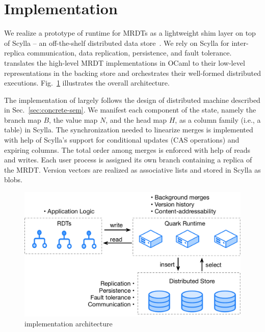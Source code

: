 \section{Implementation}
\label{sec:implementation}

We realize a prototype of \quark runtime for MRDTs as a lightweight
shim layer on top of Scylla -- an off-the-shelf distributed data
store~\cite{scylla}. We rely on Scylla for inter-replica
communication, data replication, persistence, and fault tolerance.
\quark translates the high-level MRDT implementations in OCaml to
their low-level representations in the backing store and orchestrates
their well-formed distributed executions.
Fig.~\ref{fig:implementation} illustrates the overall architecture.

The implementation of \quark largely follows the design of \quark
distributed machine described in Sec.~\ref{sec:concrete-sem}.  We
manifest each component of the state, namely the branch map $B$, the
value map $N$, and the head map $H$, as a column family (i.e., a
table) in Scylla. The synchronization needed to linearize merges is
implemented with help of Scylla's support for conditional updates (CAS
operations) and expiring columns. The total order among merges is
enforced with help of  reads and writes. Each user process
is assigned its own branch containing a replica of the MRDT.  Version
vectors are realized as associative lists and stored in Scylla as
blobs.

\begin{figure}[ht]
  \centering
    \includegraphics[scale=0.35]{Figures/implementation}
\caption{\quark implementation architecture}
\label{fig:implementation}
  \vspace*{-0.2in}
\end{figure}

